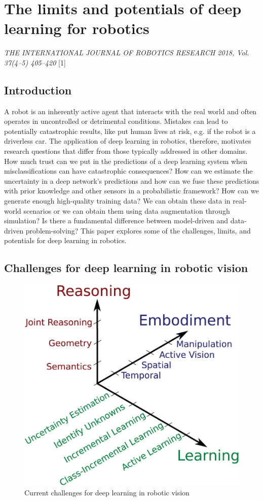 \section{The limits and potentials of deep learning for
robotics}\label{header-n5}

\emph{THE INTERNATIONAL JOURNAL OF ROBOTICS RESEARCH 2018, Vol. 37(4--5)
405--420} {[}1{]}

\subsection{Introduction}\label{header-n7}

A robot is an inherently active agent that interacts with the real world
and often operates in uncontrolled or detrimental conditions. Mistakes
can lead to potentially catastrophic results, like put human lives at
risk, e.g. if the robot is a driverless car. The application of deep
learning in robotics, therefore, motivates research questions that
differ from those typically addressed in other domains. How much trust
can we put in the predictions of a deep learning system when
misclassifications can have catastrophic consequences? How can we
estimate the uncertainty in a deep network's predictions and how can we
fuse these predictions with prior knowledge and other sensors in a
probabilistic framework? How can we generate enough high-quality
training data? We can obtain these data in real-world scenarios or we
can obtain them using data augmentation through simulation? Is there a
fundamental difference between model-driven and data-driven
problem-solving? This paper explores some of the challenges, limits, and
potentials for deep learning in robotics.

\subsection{Challenges for deep learning in robotic
vision}\label{header-n9}

\begin{figure}[h!]
	\centering
	\includegraphics[width=0.5\linewidth]{images/roboticvision.jpeg}
	\caption{Current challenges for deep learning in robotic vision}
\end{figure}

